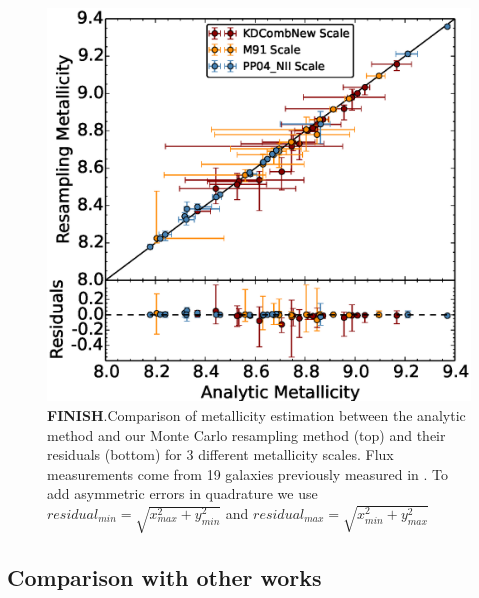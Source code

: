 \documentclass{emulateapj}
\begin{document}
\begin{figure}[ht!]
  \includegraphics[width=1.2\columnwidth]{abcomparison6.eps}
   \caption{\textbf{FINISH}.Comparison of metallicity estimation between the analytic method and our Monte Carlo resampling method (top) and their residuals (bottom) for 3 different metallicity scales. Flux measurements come from 19 galaxies previously measured in \citet{modjaz11}. To add asymmetric errors in quadrature we use $residual_{min}=\sqrt {x_{max}^2 + y_{min}^2}$ and $residual_{max}=\sqrt {x_{min}^2 + y_{max}^2}$}
 \label{comp_anal_MC}
\end{figure}





\subsection{Comparison with other works}

\end{document}
